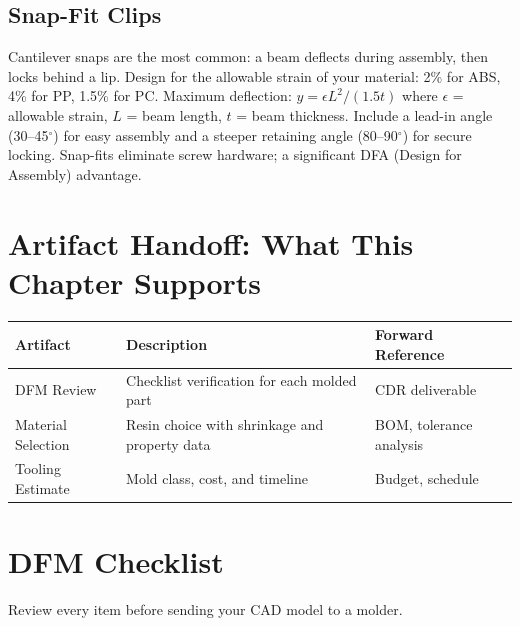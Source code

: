 \subsection{Snap-Fit Clips}
Cantilever snaps are the most common: a beam deflects during assembly, then locks behind a lip. Design for the allowable strain of your material: 2\% for ABS, 4\% for PP, 1.5\% for PC. Maximum deflection: $y = \epsilon L^2 / (1.5t)$ where $\epsilon$ = allowable strain, $L$ = beam length, $t$ = beam thickness. Include a lead-in angle (30--45$^{\circ}$) for easy assembly and a steeper retaining angle (80--90$^{\circ}$) for secure locking. Snap-fits eliminate screw hardware; a significant DFA (Design for Assembly) advantage.

\section{Artifact Handoff: What This Chapter Supports}
\begin{table}[htbp]\centering\small
\begin{tabularx}{\textwidth}{l X l}
\toprule
\textbf{Artifact} & \textbf{Description} & \textbf{Forward Reference} \\
\midrule
DFM Review & Checklist verification for each molded part & CDR deliverable \\
Material Selection & Resin choice with shrinkage and property data & BOM, tolerance analysis \\
Tooling Estimate & Mold class, cost, and timeline & Budget, schedule \\
\bottomrule
\end{tabularx}
\end{table}

\section{DFM Checklist}
\label{sec:checklist_b}

Review every item before sending your CAD model to a molder.

